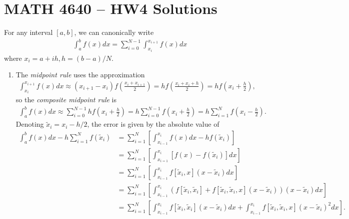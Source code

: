 \documentclass[a4paper,12pt]{article}
\begin{document}
\section*{MATH 4640 -- HW4 Solutions}
For any interval $[a, b]$, we can canonically write
\begin{align*}
    \int_a^b f(x) dx = \sum_{i = 0}^{N - 1} \int_{x_i}^{x_{i + 1}} f(x) dx
\end{align*}
where $x_i = a + ih, h = (b - a) / N$. \par
\begin{enumerate}
    \item
        The \emph{midpoint rule} uses the approximation
        \begin{align*}
            \int_{x_i}^{x_{i + 1}} f(x) dx \approx (x_{i + 1} - x_i) f \left( \frac{x_i + x_{i + 1}}{2} \right)
            = h f \left( \frac{x_i + x_i + h}{2} \right) = hf \left( x_i + \frac{h}{2} \right),
        \end{align*}
        so the \emph{composite midpoint rule} is
        \begin{align*}
            \int_a^b f(x) dx \approx \sum_{i = 0}^{N - 1} hf \left( x_i + \frac{h}{2} \right)
            = h \sum_{i = 0}^{N - 1} f \left( x_i + \frac{h}{2} \right)
            = h\sum_{i = 1}^N f \left( x_i - \frac{h}{2} \right)
            .%
        \end{align*}
        Denoting $\tilde{x}_i = x_i - h/2$, the error is given by the absolute value of
        \begin{align*}
            \int_a^b f(x) dx - h \sum_{i = 1}^N f(\tilde{x}_i)
            &= \sum_{i = 1}^N \left[ \int_{x_{i - 1}}^{x_i} f(x) dx - hf(\tilde{x}_i) \right] \\
            &= \sum_{i = 1}^N \left[ \int_{x_{i = 1}}^{x_i} \left[ f(x) - f(\tilde{x}_i) \right] dx \right] \\
            &= \sum_{i = 1}^N \left[ \int_{x_{i - 1}}^{x_i} f[\tilde{x}_i, x] \left( x - \tilde{x}_i \right) dx \right] \\
            &= \sum_{i = 1}^N \left[ \int_{x_{i - 1}}^{x_i} \left( f[\tilde{x}_i, \tilde{x}_i] + f[\tilde{x}_i, \tilde{x}_i, x](x - \tilde{x}_i) \right) \left( x - \tilde{x}_i \right) dx \right] \\
            &= \sum_{i = 1}^N \left[ \int_{x_{i - 1}}^{x_i} f[\tilde{x}_i, \tilde{x}_i] \left( x - \tilde{x}_i \right) dx + \int_{x_{i - 1}}^{x_i} f[\tilde{x}_i, \tilde{x}_i, x](x - \tilde{x}_i)^2 dx \right].
        \end{align*}

\end{enumerate}
\end{document}
